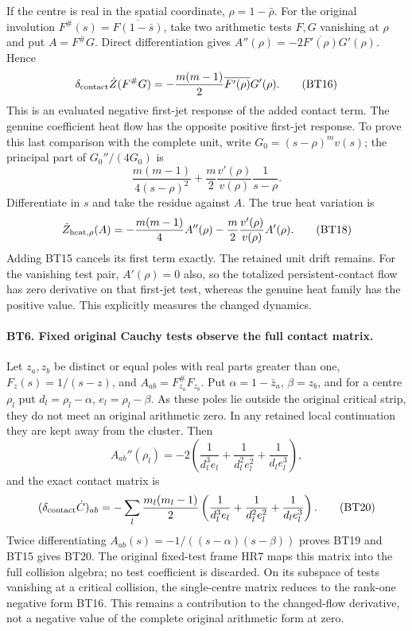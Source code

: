 If the centre is real in the spatial coordinate, $\rho=1-\bar\rho$.
For the original involution $F^\#(s)=\overline{F(1-\bar s)}$,
take two arithmetic tests $F,G$ vanishing at $\rho$ and put
$A=F^\#G$. Direct differentiation gives
$A''(\rho)=-2\overline{F'(\rho)}G'(\rho)$. Hence
\[
 \delta_{\rm contact}\dot Z(F^\#G)
       =-\frac{m(m-1)}2\overline{F'(\rho)}G'(\rho).
 \tag{BT16}
\]
This is an evaluated negative first-jet response of the added
contact term. The genuine coefficient heat flow has the opposite
positive first-jet response. To prove this last comparison with
the complete unit, write $G_0=(s-\rho)^m v(s)$; the principal
part of $G_0''/(4G_0)$ is
\[
 \frac{m(m-1)}{4(s-\rho)^2}
      +\frac m2\frac{v'(\rho)}{v(\rho)}\frac1{s-\rho}.
 \tag{BT17}
\]
Differentiate in $s$ and take the residue against $A$. The true
heat variation is
\[
 \dot Z_{\rm heat,\rho}(A)
 =-\frac{m(m-1)}4 A''(\rho)
   -\frac m2\frac{v'(\rho)}{v(\rho)}A'(\rho).
 \tag{BT18}
\]
Adding BT15 cancels its first term exactly. The retained unit
drift remains. For the vanishing test pair, $A'(\rho)=0$ also,
so the totalized persistent-contact flow has zero derivative on
that first-jet test, whereas the genuine heat family has the
positive value. This explicitly measures the changed dynamics.

\paragraph{BT6. Fixed original Cauchy tests observe the full contact matrix.}
Let $z_a,z_b$ be distinct or equal poles with real parts greater
than one, $F_z(s)=1/(s-z)$, and
$A_{ab}=F_{z_a}^\#F_{z_b}$. Put
$\alpha=1-\bar z_a$, $\beta=z_b$, and for a centre $\rho_l$
put $d_l=\rho_l-\alpha$, $e_l=\rho_l-\beta$.
As these poles lie outside the original critical strip, they do
not meet an original arithmetic zero. In any retained local
continuation they are kept away from the cluster. Then
\[
 A_{ab}''(\rho_l)=-2\left(
 \frac1{d_l^3e_l}+\frac1{d_l^2e_l^2}+\frac1{d_le_l^3}\right),
 \tag{BT19}
\]
and the exact contact matrix is
\[
 (\delta_{\rm contact}\dot C)_{ab}
 =-\sum_l\frac{m_l(m_l-1)}2
 \left(\frac1{d_l^3e_l}+\frac1{d_l^2e_l^2}+\frac1{d_le_l^3}\right).
 \tag{BT20}
\]
Twice differentiating $A_{ab}(s)=-1/((s-\alpha)(s-\beta))$
proves BT19 and BT15 gives BT20. The original fixed-test frame
HR7 maps this matrix into the full collision algebra; no test
coefficient is discarded. On its subspace of tests vanishing at
a critical collision, the single-centre matrix reduces to the
rank-one negative form BT16. This remains a contribution to
the changed-flow derivative, not a negative value of the complete
original arithmetic form at zero.

